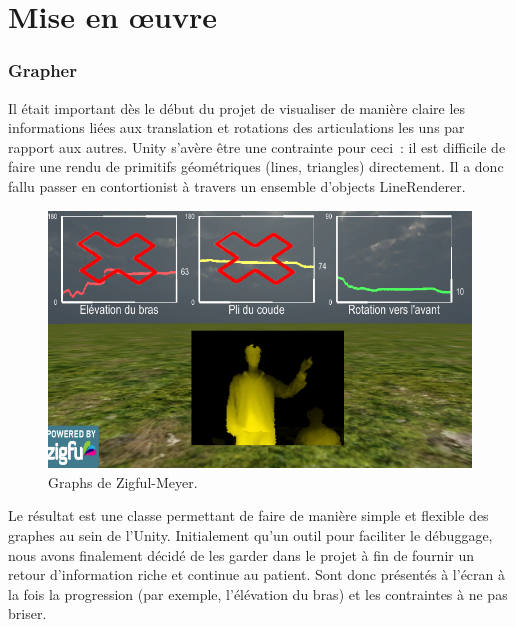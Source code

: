 \documentclass[french,12pt]{report}
\begin{document}
		\section{Mise en œuvre}

		\subsubsection{Grapher}
Il était important dès le début du projet de visualiser de manière claire les 
informations liées aux translation et rotations des articulations les uns par 
rapport aux autres. Unity s'avère être une contrainte pour ceci~: il est difficile
de faire une rendu de primitifs géométriques (lines, triangles) directement. Il
a donc fallu passer en contortionist à travers un ensemble d'objects LineRenderer.

\begin{figure}[h!]
\centering
\includegraphics[width=\linewidth]{images/zfm_graph}
\caption{Graphs de Zigful-Meyer.}
\end{figure}

Le résultat est une classe permettant de faire de manière simple et flexible des
graphes au sein de l'Unity. Initialement qu'un outil pour faciliter le 
débuggage, nous avons finalement décidé de les garder dans le projet à fin de
fournir un retour d'information riche et continue au patient. Sont donc présentés 
à l'écran à la fois la progression (par exemple, l'élévation du bras) et les 
contraintes à ne pas briser.
		
\end{document}
